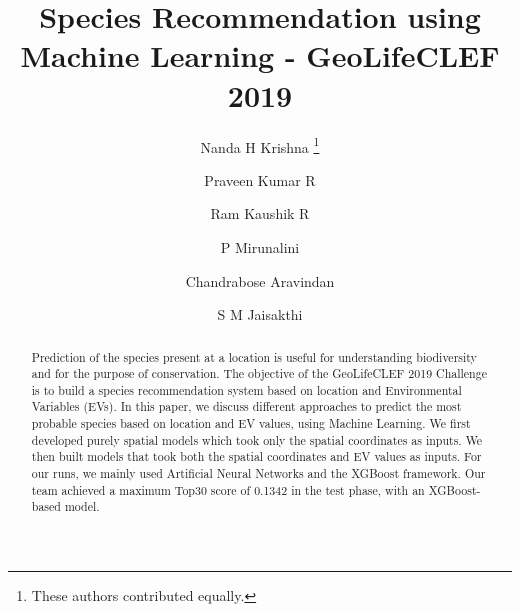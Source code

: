 \documentclass[runningheads]{llncs}
\makeatletter
\newcommand{\printfnsymbol}[1]{%
  \textsuperscript{\@fnsymbol{#1}}%
}
\makeatother
\begin{document}
\title{Species Recommendation using Machine Learning - GeoLifeCLEF 2019}

\author{Nanda H Krishna \thanks{These authors contributed equally.} \and Praveen Kumar R \printfnsymbol{1} \and
Ram Kaushik R \printfnsymbol{1} \and P Mirunalini  \and Chandrabose Aravindan  \and S M Jaisakthi }


\authorrunning{ }
\titlerunning{ }
\maketitle

\begin{abstract}
Prediction of the species present at a location is useful for understanding biodiversity and for the purpose of conservation. The objective of the GeoLifeCLEF 2019 Challenge is to build a species recommendation system based on location and Environmental Variables (EVs). In this paper, we discuss different approaches to predict the most probable species based on location and EV values, using Machine Learning. We first developed purely spatial models which took only the spatial coordinates as inputs. We then built models that took both the spatial coordinates and EV values as inputs. For our runs, we mainly used Artificial Neural Networks and the XGBoost framework. Our team achieved a maximum Top30 score of 0.1342 in the test phase, with an XGBoost-based model.

\end{abstract}
\end{document}
